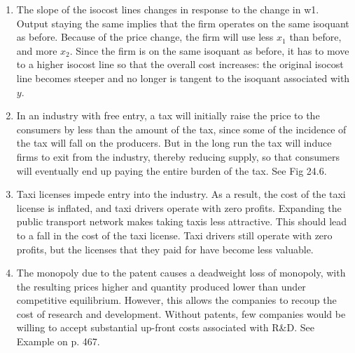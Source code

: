 \documentclass{article}
\begin{document}
\begin{enumerate}
  \item The slope of the isocost lines changes in response to the change in w1. Output staying the same implies that the firm operates on the same isoquant as before. Because of the price change, the firm will use less \(x_1\) than before, and more \(x_2\). Since the firm is on the same isoquant as before, it has to move to a higher isocost line so that the overall cost increases: the original isocost line becomes steeper and no longer is tangent to the isoquant associated with \(y\).
  \item In an industry with free entry, a tax will initially raise the price to the consumers by less than the amount of the tax, since some of the incidence of the tax will fall on the producers. But in the long run the tax will induce firms to exit from the industry, thereby reducing supply, so that consumers will eventually end up paying the entire burden of the tax. See Fig 24.6.
  \item Taxi licenses impede entry into the industry. As a result, the cost of the taxi license is inflated, and taxi drivers operate with zero profits. Expanding the public transport network makes taking taxis less attractive. This should lead to a fall in the cost of the taxi license. Taxi drivers still operate with zero profits, but the licenses that they paid for have become less valuable.
  \item The monopoly due to the patent causes a deadweight loss of monopoly, with the resulting prices higher and quantity produced lower than under competitive equilibrium. However, this allows the companies to recoup the cost of research and development. Without patents, few companies would be willing to accept substantial up-front costs associated with R\&D. See Example on p. 467.
\end{enumerate}


\printbibliography
\end{document}
